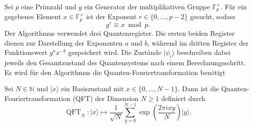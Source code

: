 Sei $p$ eine Primzahl und $g$ ein Generator der multiplikativen Gruppe $\mathbb{F}_p^\times$. Für ein gegebenes Element $x\in\mathbb{F}_p^\times$
ist der Exponent $r\in\{0,\ldots,p-2\}$ gesucht, sodass
\[
    g^r\equiv x\bmod p.
\]
Der Algorithmus verwendet drei Quantenregister. Die ersten beiden Register dienen zur Darstellung der Exponenten $a$ und $b$, während im dritten Register der Funktionswert $g^a x^{-b}$ gespeichert wird. Die Zustände $|\psi_i\rangle$ beschreiben dabei jeweils den Gesamtzustand des Quantensystems nach einem Berechnungsschritt.
Es wird für den Algorithmus die Quanten-Fouriertransformation benötigt
\begin{definition}\label{def:QFT}
    Sei $N\in\mathbb{N}$ und $\lvert x\rangle$ ein Basiszustand mit $x\in\{0,\ldots,N-1\}$. Dann ist die Quanten-Fouriertransformation (QFT) der Dimension $N\geq 1$ definiert durch
    \[
    \operatorname{QFT}_N: \lvert x\rangle
     \longmapsto
    \frac{1}{\sqrt{N}}
    \sum_{y=0}^{N-1}
    \exp\left(\frac{2\pi ixy}{N}\right)\lvert y\rangle.
\]
\end{definition}


